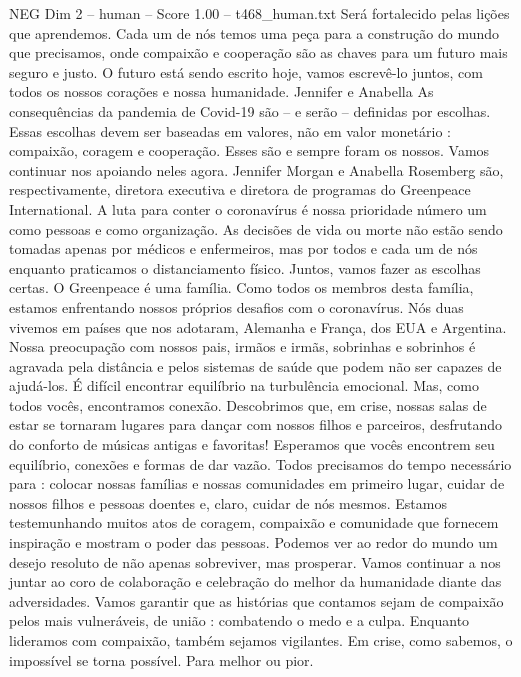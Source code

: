\begin{textsample}{NEG Dim 2 – human – Score 1.00 – t468\_human.txt}
Será fortalecido pelas lições que aprendemos.
Cada um de nós temos uma peça para a construção do mundo que precisamos, onde compaixão e cooperação são as chaves para um futuro mais seguro e justo.
O futuro está sendo escrito hoje, vamos escrevê-lo juntos, com todos os nossos corações e nossa humanidade.
Jennifer e Anabella As consequências da pandemia de Covid-19 são – e serão – definidas por escolhas.
Essas escolhas devem ser baseadas em valores, não em valor monetário : compaixão, coragem e cooperação.
Esses são e sempre foram os nossos.
Vamos continuar nos apoiando neles agora.
Jennifer Morgan e Anabella Rosemberg são, respectivamente, diretora executiva e diretora de programas do Greenpeace International.
A luta para conter o coronavírus é nossa prioridade número um como pessoas e como organização.
As decisões de vida ou morte não estão sendo tomadas apenas por médicos e enfermeiros, mas por todos e cada um de nós enquanto praticamos o distanciamento físico.
Juntos, vamos fazer as escolhas certas.
O Greenpeace é uma família.
Como todos os membros desta família, estamos enfrentando nossos próprios desafios com o coronavírus.
Nós duas vivemos em países que nos adotaram, Alemanha e França, dos EUA e Argentina.
Nossa preocupação com nossos pais, irmãos e irmãs, sobrinhas e sobrinhos é agravada pela distância e pelos sistemas de saúde que podem não ser capazes de ajudá-los. É difícil encontrar equilíbrio na turbulência emocional.
Mas, como todos vocês, encontramos conexão.
Descobrimos que, em crise, nossas salas de estar se tornaram lugares para dançar com nossos filhos e parceiros, desfrutando do conforto de músicas antigas e favoritas!
Esperamos que vocês encontrem seu equilíbrio, conexões e formas de dar vazão.
Todos precisamos do tempo necessário para : colocar nossas famílias e nossas comunidades em primeiro lugar, cuidar de nossos filhos e pessoas doentes e, claro, cuidar de nós mesmos.
Estamos testemunhando muitos atos de coragem, compaixão e comunidade que fornecem inspiração e mostram o poder das pessoas.
Podemos ver ao redor do mundo um desejo resoluto de não apenas sobreviver, mas prosperar.
Vamos continuar a nos juntar ao coro de colaboração e celebração do melhor da humanidade diante das adversidades.
Vamos garantir que as histórias que contamos sejam de compaixão pelos mais vulneráveis, de união : combatendo o medo e a culpa.
Enquanto lideramos com compaixão, também sejamos vigilantes.
Em crise, como sabemos, o impossível se torna possível.
Para melhor ou pior.

\end{textsample}
